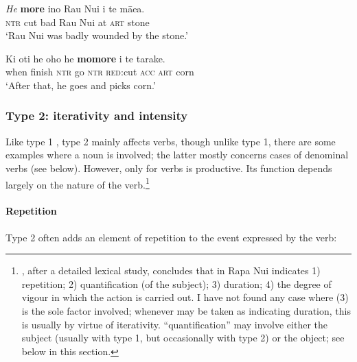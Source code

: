 \ea\label{ex:2.19}
\gll \textit{He} \textbf{more} {\ꞌ}ino Rau Nui {\ꞌ}i te mā{\ꞌ}ea.\\
\textsc{ntr} cut bad Rau Nui at \textsc{art} stone\\

\glt 
‘Rau Nui was badly wounded by the stone.’ \textstyleExampleref{[Fel-64.081]}
\z

\ea\label{ex:2.20}
\gll Ki oti he oho he \textbf{momore} i te tarake. \\
when finish \textsc{ntr} go \textsc{ntr} \textsc{red}:cut \textsc{acc} \textsc{art} corn \\

\glt 
‘After that, he goes and picks corn.’ \textstyleExampleref{[R156.013]} 
\z

\subsubsection[Type 2: iterativity and intensity]{Type 2: iterativity and intensity}\label{sec:2.6.2.2}
Like type 1 , type 2 mainly affects verbs, though unlike type 1, there are some examples where a noun is involved; the latter mostly concerns cases of denominal verbs (see below). However, only for verbs is  productive. Its function depends largely on the nature of the verb.\footnote{\label{fn:83}\citet{Johnston1978}, after a detailed lexical study, concludes that  in Rapa Nui indicates 1) repetition; 2) quantification (of the subject); 3) duration; 4) the degree of vigour in which the action is carried out. I have not found any case where (3) is the sole factor involved; whenever  may be taken as indicating duration, this is usually by virtue of iterativity. “quantification” may involve either the subject (usually with type 1, but occasionally with type 2) or the object; see below in this section.}

\paragraph{Repetition}\label{sec:2.6.2.2.1} Type 2  often adds an element of repetition to the event expressed by the verb:


